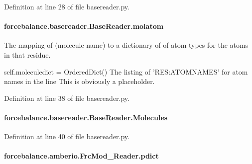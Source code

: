Definition at line 28 of file basereader.\-py.

\hypertarget{classforcebalance_1_1basereader_1_1BaseReader_a56e6e6024825ada94ab24f5f3ce59851}{
\paragraph[{molatom}]{\setlength{\rightskip}{0pt plus 5cm}forcebalance.\-basereader.\-Base\-Reader.\-molatom\hspace{0.3cm}{\ttfamily [inherited]}}}\label{classforcebalance_1_1basereader_1_1BaseReader_a56e6e6024825ada94ab24f5f3ce59851}


The mapping of (molecule name) to a dictionary of of atom types for the atoms in that residue. 

self.\-moleculedict = Ordered\-Dict() The listing of 'R\-E\-S\-:A\-T\-O\-M\-N\-A\-M\-E\-S' for atom names in the line This is obviously a placeholder. 

Definition at line 38 of file basereader.\-py.

\hypertarget{classforcebalance_1_1basereader_1_1BaseReader_ad2842550aa690f1cd82e41ec8d6fe541}{
\paragraph[{Molecules}]{\setlength{\rightskip}{0pt plus 5cm}forcebalance.\-basereader.\-Base\-Reader.\-Molecules\hspace{0.3cm}{\ttfamily [inherited]}}}\label{classforcebalance_1_1basereader_1_1BaseReader_ad2842550aa690f1cd82e41ec8d6fe541}


Definition at line 40 of file basereader.\-py.

\hypertarget{classforcebalance_1_1amberio_1_1FrcMod__Reader_a2d62765145dd710032844ac8d7ec8a34}{
\paragraph[{pdict}]{\setlength{\rightskip}{0pt plus 5cm}forcebalance.\-amberio.\-Frc\-Mod\-\_\-\-Reader.\-pdict}}\label{classforcebalance_1_1amberio_1_1FrcMod__Reader_a2d62765145dd710032844ac8d7ec8a34}


